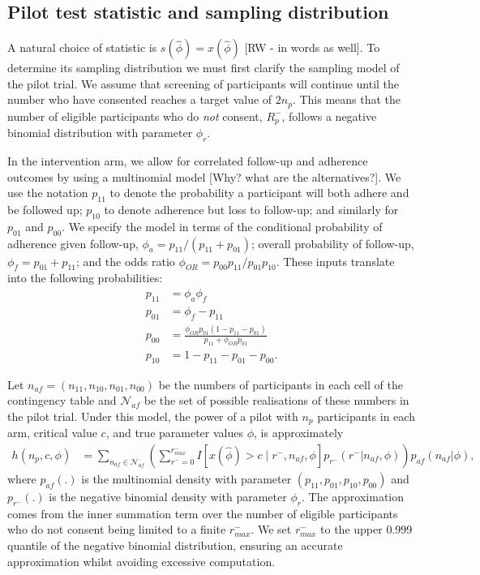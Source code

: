 \documentclass[AMA,STIX1COL]{WileyNJD-v2}
\begin{document}
\subsection{Pilot test statistic and sampling distribution}

A natural choice of statistic is $s(\hat{\phi}) = x(\hat{\phi})$ [RW - in words as well]. To determine its sampling distribution we must first clarify the sampling model of the pilot trial. We assume that screening of participants will continue until the number who have consented reaches a target value of $2n_p$. This means that the number of eligible participants who do \emph{not} consent, $R_p^-$, follows a negative binomial distribution with parameter $\phi_r$. 

In the intervention arm, we allow for correlated follow-up and adherence outcomes by using a multinomial model [Why? what are the alternatives?]. We use the notation $p_{11}$ to denote the probability a participant will both adhere and be followed up; $p_{10}$ to denote adherence but loss to follow-up; and similarly for $p_{01}$ and $p_{00}$. We specify the model in terms of the conditional probability of adherence given follow-up, $\phi_a = p_{11}/(p_{11} + p_{01})$; overall probability of follow-up, $\phi_f = p_{01} + p_{11}$; and the odds ratio $\phi_{OR} = p_{00}p_{11}/p_{01}p_{10}$. These inputs translate into the following probabilities:
\begin{align*}
p_{11} &= \phi_a \phi_f \\
p_{01} &= \phi_f - p_11 \\
p_{00} &= \frac{\phi_{OR} p_{01}(1-p_{11}-p_{01})}{p_{11} + \phi_{OR} p_{01}} \\
p_{10} &= 1 - p_{11} - p_{01} - p_{00}.
\end{align*}


Let $n_{af} = (n_{11}, n_{10}, n_{01}, n_{00})$ be the numbers of participants in each cell of the contingency table and $\mathcal{N}_{af}$ be the set of possible realisations of these numbers in the pilot trial. Under this model, the power of a pilot with $n_p$ participants in each arm, critical value $c$, and true parameter values $\phi$, is approximately
\begin{align}\label{eqn:pilot_pow}
h(n_p, c, \phi) &= \sum_{n_{af} \in \mathcal{N}_{af}} \left( \sum_{r^- = 0}^{r^-_{max}} 
I \left[ x(\hat{\phi}) > c \mid  r^-, n_{af}, \phi \right] p_{r^-}(r^- | n_{af}, \phi) \right)     
p_{af}(n_{af} |\phi),
\end{align}
where $p_{af}(.)$ is the multinomial density with parameter $(p_{11}, p_{01}, p_{10}, p_{00})$ and  $p_{r^-}(.)$ is the negative binomial density with parameter $\phi_r$. The approximation comes from the inner summation term over the number of eligible participants who do not consent being limited to a finite $r^-_{max}$. We set  $r^-_{max}$ to the upper 0.999 quantile of the negative binomial distribution, ensuring an accurate approximation whilst avoiding excessive computation.
\end{document}
